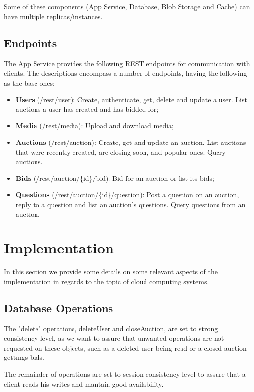 \documentclass[runningheads]{llncs}
\begin{document}
Some of these components (App Service, Database, Blob Storage and Cache) can have multiple replicas/instances.

\subsection{Endpoints}

The App Service provides the following REST endpoints for communication with clients. The descriptions encompass a number of endpoints, having the following as the base ones:

\begin{itemize}
    \item \textbf{Users} (/rest/user): Create, authenticate, get, delete and update a user. List auctions a user has created and has bidded for;
    \item \textbf{Media} (/rest/media): Upload and download media;
    \item \textbf{Auctions} (/rest/auction): Create, get and update an auction. List auctions that were recently created, are closing soon, and popular ones. Query auctions.
    \item \textbf{Bids} (/rest/auction/\{id\}/bid): Bid for an auction or list its bids;
    \item \textbf{Questions} (/rest/auction/\{id\}/question): Post a question on an auction, reply to a question and list an auction's questions. Query questions from an auction.
\end{itemize}


\section{Implementation}

In this section we provide some details on some relevant aspects of the implementation in regards to the topic of cloud computing systems.

\subsection{Database Operations}

The "delete" operations, deleteUser and closeAuction, are set to strong consistency level, as we want to assure that unwanted operations are not requested on these objects, such as a deleted user being read or a closed auction gettings bids.

The remainder of operations are set to session consistency level to assure that a client reads his writes and mantain good availability.
\end{document}
